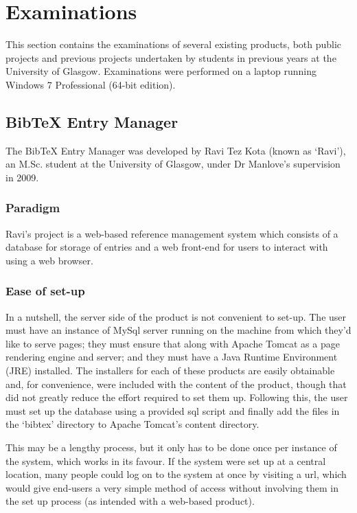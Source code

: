 \documentclass{l4proj}
\newcommand{\BibTeX}{B{\sc ib}\TeX}
\newcommand{\bibtex}{\BibTeX}
\begin{document}
\section{Examinations}
This section contains the examinations of several existing products, both public projects and previous projects undertaken by students in previous years at the University of Glasgow.  Examinations were performed on a laptop running Windows 7 Professional (64-bit edition).

\subsection{\bibtex{} Entry Manager}
The \bibtex{} Entry Manager was developed by Ravi Tez Kota (known as `Ravi'), an M.Sc. student at the University of Glasgow, under Dr Manlove's supervision in 2009.

\subsubsection{Paradigm}
Ravi's project is a web-based reference management system which consists of a database for storage of entries and a web front-end for users to interact with using a web browser.

\subsubsection{Ease of set-up}
In a nutshell, the server side of the product is not convenient to set-up.  The user must have an instance of MySql server running on the machine from which they'd like to serve pages; they must ensure that along with Apache Tomcat as a page rendering engine and server; and they must have a Java Runtime Environment (JRE) installed.  The installers for each of these products are easily obtainable and, for convenience, were included with the content of the product, though that did not greatly reduce the effort required to set them up.  Following this, the user must set up the database using a provided \gls{sql} script and finally add the files in the `bibtex' directory to Apache Tomcat's content directory.  

This may be a lengthy process, but it only has to be done once per instance of the system, which works in its favour. If the system were set up at a central location, many people could log on to the system at once by visiting a \gls{url}, which would give end-users a very simple method of access without involving them in the set up process (as intended with a web-based product).
\end{document}

